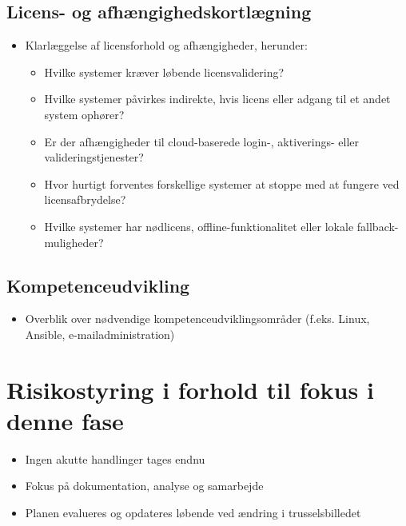 \documentclass[a4paper,11pt]{book}
\begin{document}
\subsection{Licens- og
afhængighedskortlægning}\label{licens--og-afhuxe6ngighedskortluxe6gning}

\begin{itemize}
\item
  Klarlæggelse af licensforhold og afhængigheder, herunder:

  \begin{itemize}
  \tightlist
  \item
    Hvilke systemer kræver løbende licensvalidering?
  \item
    Hvilke systemer påvirkes indirekte, hvis licens eller adgang til et
    andet system ophører?
  \item
    Er der afhængigheder til cloud-baserede login-, aktiverings- eller
    valideringstjenester?
  \item
    Hvor hurtigt forventes forskellige systemer at stoppe med at fungere
    ved licensafbrydelse?
  \item
    Hvilke systemer har nødlicens, offline-funktionalitet eller lokale
    fallback-muligheder?
  \end{itemize}
\end{itemize}

\subsection{Kompetenceudvikling}\label{kompetenceudvikling}

\begin{itemize}
\tightlist
\item
  Overblik over nødvendige kompetenceudviklingsområder (f.eks. Linux,
  Ansible, e-mailadministration)
\end{itemize}

\section{Risikostyring i forhold til fokus i denne
fase}\label{risikostyring-i-forhold-til-fokus-i-denne-fase}

\begin{itemize}
\tightlist
\item
  Ingen akutte handlinger tages endnu
\item
  Fokus på dokumentation, analyse og samarbejde
\item
  Planen evalueres og opdateres løbende ved ændring i trusselsbilledet
\end{itemize}
\end{document}

